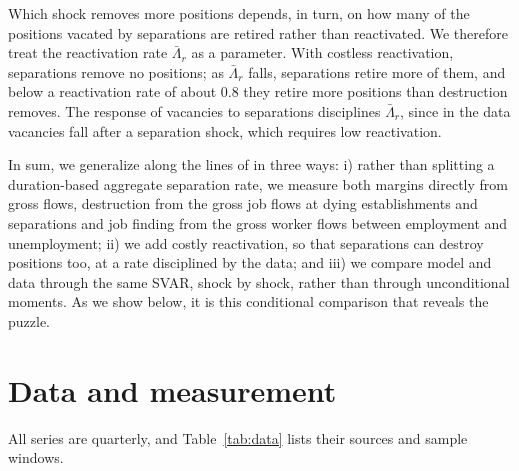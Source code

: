 \documentclass[authoryear, review, 12pt]{elsarticle}
\begin{document}
Which shock removes more positions depends, in turn, on how many of the positions vacated by separations are retired rather than reactivated. We therefore treat the reactivation rate $\bar\Lambda_r$ as a parameter. With costless reactivation, separations remove no positions; as $\bar\Lambda_r$ falls, separations retire more of them, and below a reactivation rate of about 0.8 they retire more positions than destruction removes. The response of vacancies to separations disciplines $\bar\Lambda_r$, since in the data vacancies fall after a separation shock, which requires low reactivation.

In sum, we generalize \citet{coles_2018} along the lines of \citet{gabrovski_2025} in three ways: i) rather than splitting a duration-based aggregate separation rate, we measure both margins directly from gross flows, destruction from the gross job flows at dying establishments and separations and job finding from the gross worker flows between employment and unemployment; ii) we add costly reactivation, so that separations can destroy positions too, at a rate disciplined by the data; and iii) we compare model and data through the same SVAR, shock by shock, rather than through unconditional moments. As we show below, it is this conditional comparison that reveals the puzzle.

\section{Data and measurement}\label{sec:data}

All series are quarterly, and Table~\ref{tab:data} lists their sources and sample windows.
\end{document}
